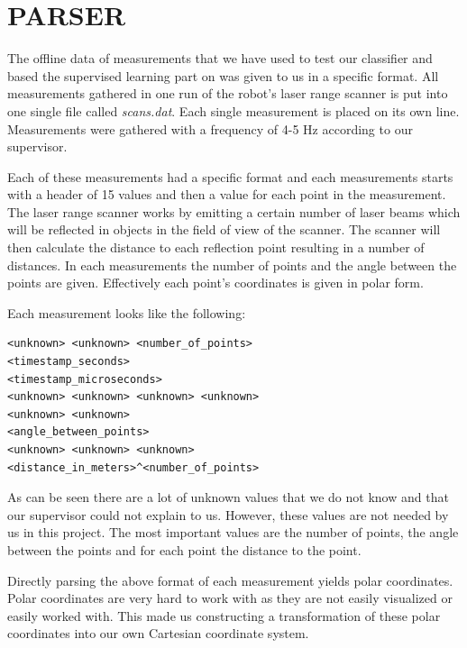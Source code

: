 \documentclass[a4paper, 10pt, conference]{ieeeconf}      %
\begin{document}
\section{PARSER}
The offline data of measurements that we have used to test our classifier and based the supervised learning part on was given to us in a specific format. All measurements gathered in one run of the robot's laser range scanner is put into one single file called \emph{scans.dat}. Each single measurement is placed on its own line. Measurements were gathered with a frequency of 4-5 Hz according to our supervisor.

Each of these measurements had a specific format and each measurements starts with a header of 15 values and then a value for each point in the measurement. The laser range scanner works by emitting a certain number of laser beams which will be reflected in objects in the field of view of the scanner. The scanner will then calculate the distance to each reflection point resulting in a number of distances. In each measurements the number of points and the angle between the points are given. Effectively each point's coordinates is given in polar form.

Each measurement looks like the following:

\begin{verbatim}
<unknown> <unknown> <number_of_points>
<timestamp_seconds> 
<timestamp_microseconds>
<unknown> <unknown> <unknown> <unknown>
<unknown> <unknown> 
<angle_between_points>
<unknown> <unknown> <unknown>
<distance_in_meters>^<number_of_points>
\end{verbatim}

As can be seen there are a lot of unknown values that we do not know and that our supervisor could not explain to us. However, these values are not needed by us in this project. The most important values are the number of points, the angle between the points and for each point the distance to the point.

Directly parsing the above format of each measurement yields polar coordinates. Polar coordinates are very hard to work with as they are not easily visualized or easily worked with. This made us constructing a transformation of these polar coordinates into our own Cartesian coordinate system.
\end{document}

